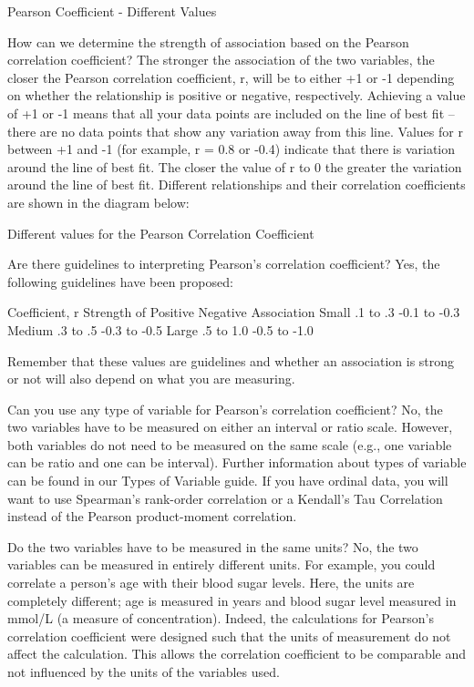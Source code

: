 \documentclass[]{article}
\begin{document}
Pearson Coefficient - Different Values 

How can we determine the strength of association based on the Pearson correlation coefficient?
The stronger the association of the two variables, the closer the Pearson correlation coefficient, r, will be to either +1 or -1 depending on whether the relationship is positive or negative, respectively. Achieving a value of +1 or -1 means that all your data points are included on the line of best fit – there are no data points that show any variation away from this line. Values for r between +1 and -1 (for example, r = 0.8 or -0.4) indicate that there is variation around the line of best fit. The closer the value of r to 0 the greater the variation around the line of best fit. Different relationships and their correlation coefficients are shown in the diagram below:

Different values for the Pearson Correlation Coefficient 


Are there guidelines to interpreting Pearson's correlation coefficient?
Yes, the following guidelines have been proposed:

 	Coefficient, r
Strength of 	Positive	Negative
Association
Small	.1 to .3	-0.1 to -0.3
Medium	.3 to .5	-0.3 to -0.5
Large	.5 to 1.0	-0.5 to -1.0

Remember that these values are guidelines and whether an association is strong or not will also depend on what you are measuring.

Can you use any type of variable for Pearson's correlation coefficient?
No, the two variables have to be measured on either an interval or ratio scale. However, both variables do not need to be measured on the same scale (e.g., one variable can be ratio and one can be interval). Further information about types of variable can be found in our Types of Variable guide. If you have ordinal data, you will want to use Spearman's rank-order correlation or a Kendall's Tau Correlation instead of the Pearson product-moment correlation.

Do the two variables have to be measured in the same units?
No, the two variables can be measured in entirely different units. For example, you could correlate a person's age with their blood sugar levels. Here, the units are completely different; age is measured in years and blood sugar level measured in mmol/L (a measure of concentration). Indeed, the calculations for Pearson's correlation coefficient were designed such that the units of measurement do not affect the calculation. This allows the correlation coefficient to be comparable and not influenced by the units of the variables used.
\end{document}
